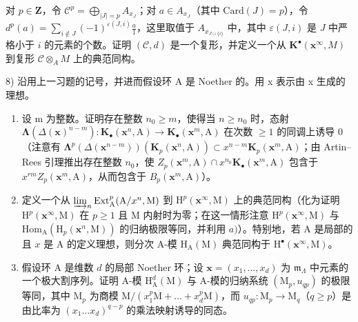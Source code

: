 对 \(p \in \mathbf{Z}\)，令 \(\mathcal{C}^p = \bigoplus_{|J| = p} A_{x_J}\)；对 \(a \in A_{x_J}\)（其中 \(\text{Card}(J) = p\)），令 \(d^p(a) = \sum_{i \notin J} (-1)^{\varepsilon(J, i)} \frac{a}{1}\)，这里取值于 \(A_{x_{J \cup \{i\}}}\) 中，其中 \(\varepsilon(J, i)\) 是 \(J\) 中严格小于 \(i\) 的元素的个数。证明 \((\mathcal{C}, d)\) 是一个复形，并定义一个从 \(\mathbf{K}^\bullet(\mathbf{x}^\infty, M)\) 到复形 \(\mathcal{C} \otimes_A M\) 上的典范同构。

8) 沿用上一习题的记号，并进而假设环 A 是 Noether 的。用 x 表示由 x 生成的理想。

\begin{enumerate}
\def\labelenumi{\alph{enumi})}
\item
  设 m 为整数。证明存在整数 \(n_{0} \geqslant m\)，使得当 \(n \geqslant n_{0}\) 时，态射 \(\boldsymbol{\Lambda}(\Delta(\mathbf{x})^{n-m}) : \mathbf{K}_{\bullet}(\mathbf{x}^{n}, \mathrm{A}) \longrightarrow \mathbf{K}_{\bullet}(\mathbf{x}^{m}, \mathrm{A})\) 在次数 \(\geqslant 1\) 的同调上诱导 0（注意有 \(\boldsymbol{\Lambda}^{p}(\Delta(\mathbf{x}^{n-m}))(\mathbf{K}_{p}(\mathbf{x}^{n}, \mathrm{A})) \subset x^{n-m}\mathbf{K}_{p}(\mathbf{x}^{m}, \mathrm{A})\)；由 Artin–Rees 引理推出存在整数 \(n_{0}\)，使 \(Z_{p}(\mathbf{x}^{m}, \mathrm{A}) \cap x^{n_{0}}\mathbf{K}_{\bullet}(\mathbf{x}^{m}, \mathrm{A})\) 包含于 \(x^{rm}Z_{p}(\mathbf{x}^{m}, \mathrm{A})\)，从而包含于 \(B_{p}(\mathbf{x}^{m}, \mathrm{A})\)）。
\item
  定义一个从 \(\varinjlim_{n}\mathrm{Ext}_{\mathrm{A}}^{p}(\mathrm{A}/x^{n},\mathrm{M})\) 到 \(\mathrm{H}^p (\mathbf{x}^\infty ,\mathrm{M})\) 上的典范同构（化为证明 \(\mathrm{H}^p (\mathbf{x}^\infty ,\mathrm{M})\) 在 \(p\geqslant 1\) 且 M 内射时为零；在这一情形注意 \(\mathrm{H}^p (\mathbf{x}^\infty ,\mathrm{M})\) 与 \(\mathrm{Hom}_{\mathrm{A}}(\mathrm{H}_p(\mathbf{x}^n,\mathrm{M}))\) 的归纳极限等同，并利用 \(a)\)）。特别地，若 A 是局部的且 \(x\) 是 A 的定义理想，则分次 A-模 \(\mathrm{H}_{\mathrm{A}}(\mathrm{M})\) 典范同构于 \(\mathrm{H}^{\bullet}(\mathbf{x}^{\infty},\mathrm{M})\)。
\item
  假设环 A 是维数 \(d\) 的局部 Noether 环；设 \(\mathbf{x} = (x_{1},\ldots ,x_{d})\) 为 \(\mathfrak{m}_{\Lambda}\) 中元素的一个极大割序列。证明 A-模 \(\mathrm{H}_{\mathrm{A}}^{d}(\mathrm{M})\) 与 A-模的归纳系统 \((\mathrm{M}_p,u_{qp})\) 的极限等同，其中 \(\mathrm{M}_p\) 为商模 \(\mathrm{M} / (x_1^p\mathrm{M} + \dots +x_d^p\mathrm{M})\)，而 \(u_{qp}:\mathrm{M}_p\to \mathrm{M}_q\)（\(q\geqslant p\)）是由比率为 \((x_{1}\dots x_{d})^{q - p}\) 的乘法映射诱导的同态。
\end{enumerate}

